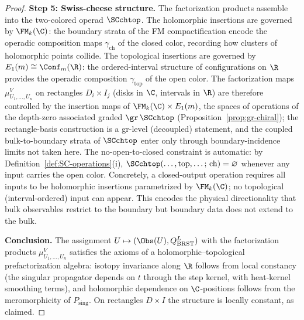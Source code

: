 \begin{proof}
\medskip\noindent\textbf{Step 5: Swiss-cheese structure.}
The factorization products assemble into the two-colored operad $\SCchtop$. The holomorphic insertions are governed by $\FM_k(\C)$: the boundary strata of the FM compactification encode the operadic composition maps $\gamma_{\mathrm{ch}}$ of the closed color, recording how clusters of holomorphic points collide. The topological insertions are governed by $E_1(m) \cong \Conf_m(\R)$: the ordered-interval structure of configurations on $\R$ provides the operadic composition $\gamma_{\mathrm{top}}$ of the open color. The factorization maps $\mu^V_{U_1,\ldots,U_n}$ on rectangles $D_i\times I_j$ (disks in $\C$, intervals in $\R$) are therefore controlled by the insertion maps of $\FM_k(\C)\times E_1(m)$, the spaces of operations of the depth-zero associated graded $\gr\,\SCchtop$ (Proposition~\ref{prop:gr-chiral}); the rectangle-basis construction is a gr-level (decoupled) statement, and the coupled bulk-to-boundary strata of $\SCchtop$ enter only through boundary-incidence limits not taken here. The no-open-to-closed constraint is automatic: by Definition~\ref{def:SC-operations}(i), $\SCchtop(\ldots,\mathrm{top},\ldots;\,\mathrm{ch})=\varnothing$ whenever any input carries the open color. Concretely, a closed-output operation requires all inputs to be holomorphic insertions parametrized by $\FM_k(\C)$; no topological (interval-ordered) input can appear. This encodes the physical directionality that bulk observables restrict to the boundary but boundary data does not extend to the bulk.

\medskip\noindent\textbf{Conclusion.}
The assignment $U\mapsto (\Obs(U), Q_{\mathrm{BRST}}^L)$ with the factorization products $\mu^V_{U_1,\ldots,U_n}$ satisfies the axioms of a holomorphic--topological prefactorization algebra: isotopy invariance along $\R$ follows from local constancy (the singular propagator depends on $t$ through the step kernel, with heat-kernel smoothing terms), and holomorphic dependence on $\C$-positions follows from the meromorphicity of \(P_{\mathrm{sing}}\). On rectangles $D\times I$ the structure is locally constant, as claimed.
\end{proof}

